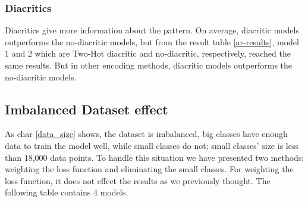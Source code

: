 \subsubsection{Diacritics}
 Diacritics give more information about the pattern. On average, diacritic models
outperforms the no-diacritic models, but from the result table \ref{ar-results},
model 1 and 2 which are Two-Hot diacritic and no-diacritic, respectively, reached
the same results. But in other encoding methods, diacritic models outperforms the
no-diacritic models.







  
\subsection{Imbalanced Dataset effect}
As char \ref{data_size} shows, the dataset is imbalanced, big classes have enough
data to train the model well, while small classes do not; small classes' size is
less than 18,000 data points. To handle this situation we have presented two
methods: weighting the loss function and eliminating the small classes. For
weighting the loss function, it does not effect the results as we previously
thought. The following table contains 4 models.

